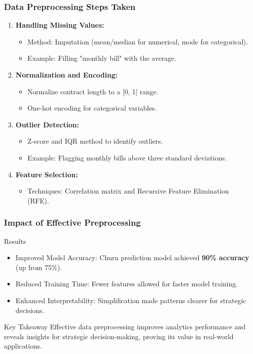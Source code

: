 \documentclass[aspectratio=169]{beamer}
\begin{document}
\begin{frame}[fragile]
    \frametitle{Data Preprocessing Steps Taken}
    \begin{enumerate}
        \item \textbf{Handling Missing Values:} 
        \begin{itemize}
            \item Method: Imputation (mean/median for numerical, mode for categorical).
            \item Example: Filling "monthly bill" with the average.
        \end{itemize}
        
        \item \textbf{Normalization and Encoding:}
        \begin{itemize}
            \item Normalize contract length to a [0, 1] range.
            \item One-hot encoding for categorical variables.
        \end{itemize}
        
        \item \textbf{Outlier Detection:} 
        \begin{itemize}
            \item Z-score and IQR method to identify outliers.
            \item Example: Flagging monthly bills above three standard deviations.
        \end{itemize}

        \item \textbf{Feature Selection:} 
        \begin{itemize}
            \item Techniques: Correlation matrix and Recursive Feature Elimination (RFE).
        \end{itemize}
    \end{enumerate}
\end{frame}

\begin{frame}[fragile]
    \frametitle{Impact of Effective Preprocessing}
    \begin{block}{Results}
        \begin{itemize}
            \item Improved Model Accuracy: Churn prediction model achieved \textbf{90\% accuracy} (up from 75\%).
            \item Reduced Training Time: Fewer features allowed for faster model training.
            \item Enhanced Interpretability: Simplification made patterns clearer for strategic decisions.
        \end{itemize}
    \end{block}
    \begin{block}{Key Takeaway}
        Effective data preprocessing improves analytics performance and reveals insights for strategic decision-making, proving its value in real-world applications.
    \end{block}
\end{frame}
\end{document}
